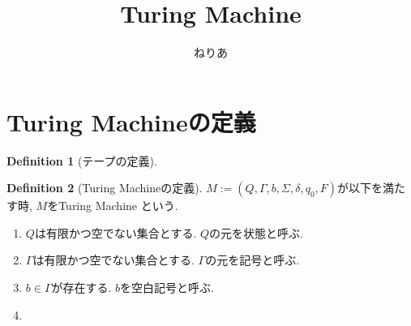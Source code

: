 \documentclass[a4paper,12pt]{article}
\title{Turing Machine}
\author{ねりあ}
\theoremstyle{definition}
\newtheorem{defi}{Definition}[section]
\begin{document}
\maketitle

\section{Turing Machineの定義}

\begin{defi}[テープの定義]

\end{defi}

\begin{defi}[Turing Machineの定義]
$M:=(Q,\Gamma,b,\Sigma,\delta,q_{0},F)$が以下を満たす時, $M$をTuring Machine という.
\begin{enumerate}
\item $Q$は有限かつ空でない集合とする.
$Q$の元を状態と呼ぶ.
\item $\Gamma$は有限かつ空でない集合とする.
$\Gamma$の元を記号と呼ぶ.
\item $b\in \Gamma$が存在する.
$b$を空白記号と呼ぶ.
\item 
\end{enumerate}
\end{defi}
\end{document}
